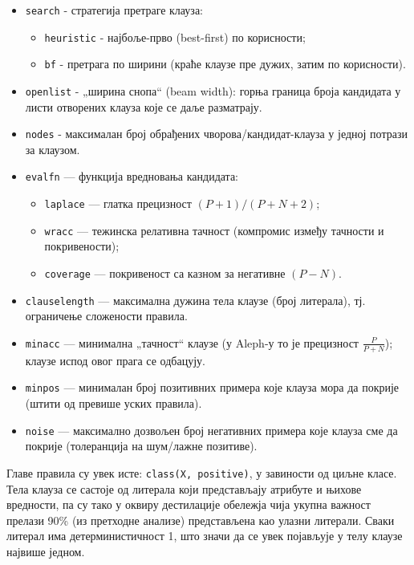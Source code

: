 \begin{itemize}
    \item \texttt{search} - стратегија претраге клауза:
    \begin{itemize}
        \item \texttt{heuristic} - најбоље-прво (best-first) по корисности;
        \item \texttt{bf} - претрага по ширини (краће клаузе пре дужих, затим по корисности).
    \end{itemize}
    \item \texttt{openlist} - „ширина снопа“ (beam width): горња граница броја кандидата у листи отворених клауза које се даље разматрају.
    \item \texttt{nodes} - максималан број обрађених чворова/кандидат-клауза у једној потрази за клаузом.
    \item \texttt{evalfn} — функција вредновања кандидата:
    \begin{itemize}
        \item \texttt{laplace} — глатка прецизност \((P+1)/(P+N+2)\);
        \item \texttt{wracc} — тежинска релативна тачност (компромис између тачности и покривености);
        \item \texttt{coverage} — покривеност са казном за негативне \((P-N)\).
    \end{itemize}
    \item \texttt{clauselength} — максимална дужина тела клаузе (број литерала), тј. ограничење сложености правила.
    \item \texttt{minacc} — минимална „тачност“ клаузе (у Aleph-у то је прецизност \(\frac{P}{P+N}\)); клаузе испод овог прага се одбацују.
    \item \texttt{minpos} — минималан број позитивних примера које клауза мора да покрије (штити од превише уских правила).
    \item \texttt{noise} — максимално дозвољен број негативних примера које клауза сме да покрије (толеранција на шум/лажне позитиве). \cite{aleph_manual}
\end{itemize}

Главе правила су увек исте: \texttt{class(X, positive)}, у завиности од циљне класе. Тела клауза се састоје од литерала који представљају атрибуте и њихове вредности, па су тако у оквиру дестилације обележја чија укупна важност прелази 90\% (из претходне анализе) представљена као улазни литерали. Сваки литерал има детерминистичност 1, што значи да се увек појављује у телу клаузе највише једном.

